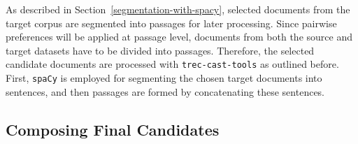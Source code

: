 As described in Section~\ref{segmentation-with-spacy}, selected documents from the target corpus are segmented into passages for later processing. Since pairwise preferences will be applied at passage level, documents from both the source and target datasets have to be divided into passages. Therefore, the selected candidate documents are processed with \texttt{trec-cast-tools} as outlined before. First, \texttt{spaCy} is employed for segmenting the chosen target documents into sentences, and then passages are formed by concatenating these sentences.

\subsection{Composing Final Candidates}\label{composing-final-candidates}

